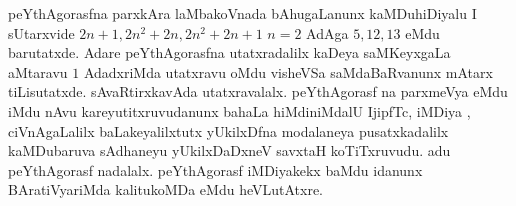 peYthAgorasfna parxkAra laMbakoVnada bAhugaLanunx kaMDuhiDiyalu I sUtarxvide $2n+1, 2n^{2}+2n, 2n^{2}+2n+1$  \quad $n=2$ \;AdAga $5,12,13$ eMdu barutatxde. Adare peYthAgorasfna utatxradalilx kaDeya saMKeyxgaLa aMtaravu $1$ AdadxriMda utatxravu oMdu visheVSa saMdaBaRvanunx mAtarx tiLisutatxde. sAvaRtirxkavAda utatxravalalx. peYthAgorasf na parxmeVya eMdu iMdu nAvu kareyutitxruvudanunx bahaLa hiMdiniMdalU IjipfTc, iMDiya , ciVnAgaLalilx baLakeyalilxtutx yUkilxDfna modalaneya pusatxkadalilx kaMDubaruva sAdhaneyu yUkilxDaDxneV savxtaH koTiTxruvudu. adu peYthAgorasf nadalalx. peYthAgorasf iMDiyakekx baMdu idanunx BAratiVyariMda kalitukoMDa eMdu heVLutAtxre.















